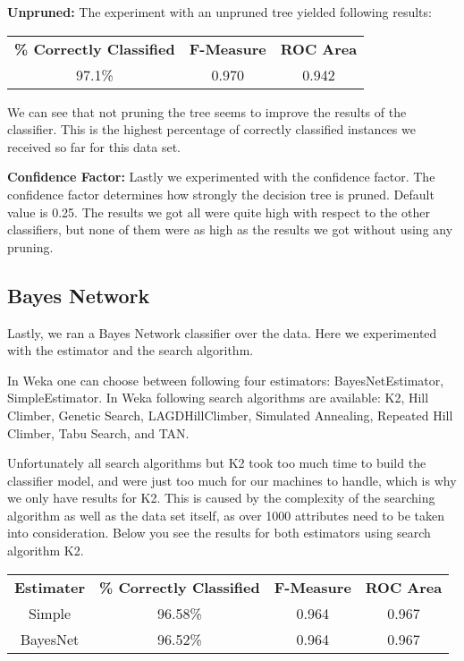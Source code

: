 \documentclass{article}
\begin{document}
\textbf{Unpruned:}
The experiment with an unpruned tree yielded following results:

\begin{center}
\begin{tabular}{c | c | c}
\textbf{\% Correctly Classified} & \textbf{F-Measure} & \textbf{ROC Area}\\
97.1\% & 0.970 & 0.942\\
\end{tabular}
\end{center}

We can see that not pruning the tree seems to improve the results of the classifier. This is the highest percentage of correctly classified instances we received so far for this data set.

\textbf{Confidence Factor:}
Lastly we experimented with the confidence factor. The confidence factor determines how strongly the decision tree is pruned. Default value is 0.25. The results we got all were quite high with respect to the other classifiers, but none of them were as high as the results we got without using any pruning. 

\subsection{Bayes Network}
Lastly, we ran a Bayes Network classifier over the data. Here we experimented with the estimator and the search algorithm.

In Weka one can choose between following four estimators: BayesNetEstimator, SimpleEstimator.
In Weka following search algorithms are available: K2, Hill Climber, Genetic Search, LAGDHillClimber, Simulated Annealing, Repeated Hill Climber, Tabu Search, and TAN.

Unfortunately all search algorithms but K2 took too much time to build the classifier model, and were just too much for our machines to handle, which is why we only have results for K2. This is caused by the complexity of the searching algorithm as well as the data set itself, as over 1000 attributes need to be taken into consideration. Below you see the results for both estimators using search algorithm K2.

\begin{center}
\begin{tabular}{ c | c | c | c}
\textbf{Estimater} & \textbf{\% Correctly Classified} & \textbf{F-Measure} & \textbf{ROC Area}\\
Simple   & 96.58\% & 0.964 & 0.967\\
BayesNet & 96.52\% & 0.964 & 0.967\\
\end{tabular}
\end{center}
\end{document}
